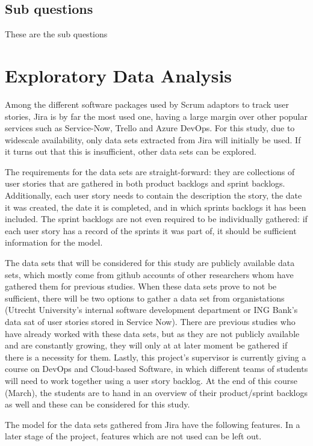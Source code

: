 \documentclass[sigconf]{acmart}
\begin{document}
\subsection{Sub questions}
These are the sub questions

\section{Exploratory Data Analysis}
Among the different software packages used by Scrum adaptors to track user stories, Jira is by far the most used one, having a large margin over other popular services such as Service-Now, Trello and Azure DevOps.
For this study, due to widescale availability, only data sets extracted from Jira will initially be used. If it turns out that this is insufficient, other data sets can be explored.

The requirements for the data sets are straight-forward: they are collections of user stories that are gathered in both product backlogs and sprint backlogs. Additionally, each user story needs to contain the description the story, the date it was created, the date it is completed, and in which sprints backlogs it has been included.
The sprint backlogs are not even required to be individually gathered: if each user story has a record of the sprints it was part of, it should be sufficient information for the model.

The data sets that will be considered for this study are publicly available data sets, which mostly come from github accounts of other researchers whom have gathered them for previous studies. 
When these data sets prove to not be sufficient, there will be two options to gather a data set from organistations (Utrecht University's internal software development department or ING Bank's data sat of user stories stored in Service Now).
There are previous studies who have already worked with these data sets, but as they are not publicly available and are constantly growing, they will only at at later moment be gathered if there is a necessity for them.
Lastly, this project's supervisor is currently giving a course on DevOps and Cloud-based Software, in which different teams of students will need to work together using a user story backlog. At the end of this course (March), the students are to hand in an overview of their product/sprint backlogs as well and these can be considered for this study.

The model for the data sets gathered from Jira have the following features. In a later stage of the project, features which are not used can be left out.
\end{document}

